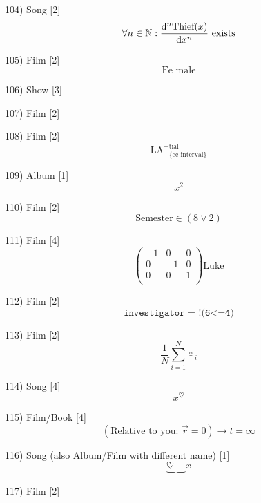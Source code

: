 \documentclass[10pt]{article}
\begin{document}
    104) Song [2]
    \[
      \forall n \in \mathbb{N}:  \dv[n]{\text{Thief}(x)}{x} \text{ exists}
    \]
      
    105) Film [2]
    \[
        \text{Fe male}
    \]

    106) Show [3]
    \begin{figure}
    \end{figure}
    
    107) Film [2]
    \begin{figure}
    \end{figure}

    108) Film [2]
    \[
      \text{LA}^{+ \text{tial}}_{-\text{\{ce interval\}}}
    \]

    109) Album [1]
    \[
      x^2
    \]
    
    110) Film [2]
    \[
      \text{Semester} \in (8  \lor 2)
    \]

    111) Film [4]
    \[
        \begin{pmatrix}
          -1 & 0 & 0 \\
          0 & -1 & 0 \\
          0 & 0  & 1 \\
        \end{pmatrix}
        \text{Luke} 
    \]

    112) Film [2]
    \[
      \texttt{investigator = !(6<=4)}
    \]

    113) Film [2]
    \[
        \frac{1}{N} \sum_{i=1}^{N}\female_i
\]

    114) Song [4]
    \[
      x^\heartsuit
    \]

    115) Film/Book [4]
    \[
      (\text{Relative to you: } \vec{r}=0 ) \to t = \infty
    \]

    116) Song (also Album/Film with different name) [1]
    \[
        \underbrace{\heartsuit -} x   
    \]

    117) Film [2]
    \begin{figure}
    \end{figure}
\end{document}
